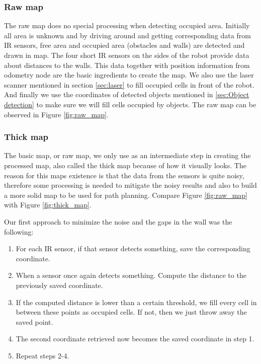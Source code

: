 \subsubsection{Raw map}
The raw map does no special processing when detecting occupied area. Initially all area is unknown and by driving around and getting corresponding data from IR sensors, free area and occupied area (obstacles and walls) are detected and drawn in map. The four short IR sensors on the sides of the robot provide data about distances to the walls. This data together with position information from odometry node are the basic ingredients to create the map.
We also use the laser scanner mentioned in section \ref{sec:laser} to fill occupied cells in front of the robot. And finally we use the coordinates of detected objects mentioned in \ref{sec:Object detection} to make sure we will fill cells occupied by objects. The raw map can be observed in Figure \ref{fig:raw_map}.


\subsubsection{Thick map}
The basic map, or raw map, we only use as an intermediate step in creating the processed map, also called the thick map because of how it visually looks. The reason for this maps existence is that the data from the sensors is quite noisy, therefore some processing is needed to mitigate the noisy results and also to build a more solid map to be used for path planning. Compare Figure \ref{fig:raw_map} with Figure \ref{fig:thick_map}.

Our first approach to minimize the noise and the gaps in the wall was the following:

\begin{enumerate}
\item For each IR sensor, if that sensor detects something, save the corresponding coordinate.
\item When a sensor once again detects something. Compute the distance to the previously saved coordinate.
\item If the computed distance is lower than a certain threshold, we fill every cell in between these points as occupied cells. If not, then we just throw away the saved point.
\item The second coordinate retrieved now becomes the saved coordinate in step 1.
\item Repeat steps 2-4.
\end{enumerate}


